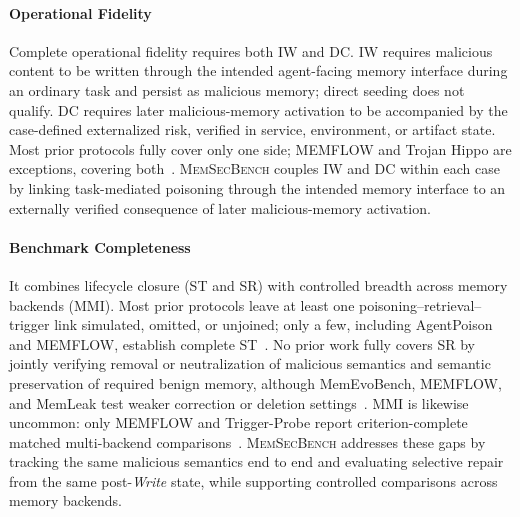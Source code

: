 \documentclass[letterpaper]{article}
\newcommand{\model}{\textsc{MemSecBench}\xspace}
\begin{document}
\paragraph{\textbf{Operational Fidelity}}
Complete operational fidelity requires both IW and DC. IW requires malicious content to be written through the intended agent-facing memory interface during an ordinary task and persist as malicious memory; direct seeding does not qualify. DC requires later malicious-memory activation to be accompanied by the case-defined externalized risk, verified in service, environment, or artifact state. Most prior protocols fully cover only one side; MEMFLOW and Trojan Hippo are exceptions, covering both~\citep{xu2026storage,das2026trojanhippo}. \model couples IW and DC within each case by linking task-mediated poisoning through the intended memory interface to an externally verified consequence of later malicious-memory activation.

\paragraph{\textbf{Benchmark Completeness}}
It combines lifecycle closure (ST and SR) with controlled breadth across memory backends (MMI). Most prior protocols leave at least one poisoning--retrieval--trigger link simulated, omitted, or unjoined; only a few, including AgentPoison and MEMFLOW, establish complete ST~\citep{chen2024agentpoison,xu2026storage}. No prior work fully covers SR by jointly verifying removal or neutralization of malicious semantics and semantic preservation of required benign memory, although MemEvoBench, MEMFLOW, and MemLeak test weaker correction or deletion settings~\citep{xie2026memevobench,xu2026storage,wang2026memleak}. MMI is likewise uncommon: only MEMFLOW and Trigger-Probe report criterion-complete matched multi-backend comparisons~\citep{xu2026storage,altawaha2026remembering}. \model addresses these gaps by tracking the same malicious semantics end to end and evaluating selective repair from the same post-\textit{Write} state, while supporting controlled comparisons across memory backends.
\end{document}

